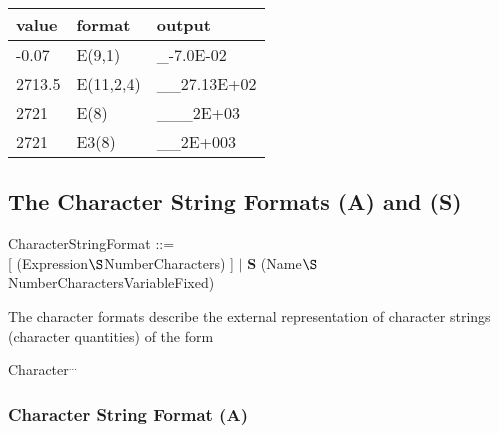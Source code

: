 \begin{added}
\begin{tabular}{lll}
value  & format    & output \\ \hline
-0.07  & E(9,1)    & \_-7.0E-02 \\
2713.5 & E(11,2,4) & \_\_27.13E+02 \\
2721   & E(8)      & \_\_\_2E+03 \\
2721   & E3(8)      & \_\_2E+003
\end{tabular}
\end{added}

\subsection{The Character String Formats (A) and (S)}  %
\label{sec_dation_a_format}

CharacterStringFormat ::=\\
 [ (Expression$\S $NumberCharacters) ] $\mid$ {\bf S} (Name$\S $NumberCharactersVariableFixed)

The character formats describe the external representation of character
strings (character quantities) of the form

Character$^{...}$

\subsubsection{Character String Format (A)}

